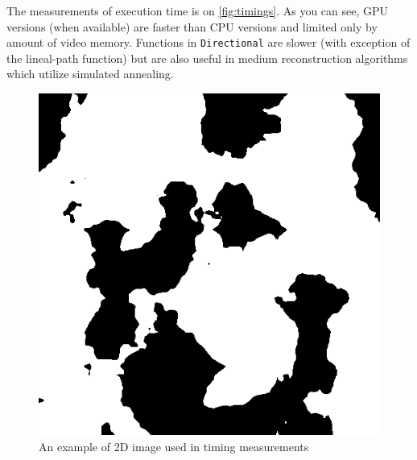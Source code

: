 \documentclass[reprint,amsmath,amssymb,aps,pre]{revtex4-1}
\newcommand{\code}[1]{\colorbox{light-gray}{\texttt{#1}}}
\begin{document}
The measurements of execution time is on \cref{fig:timings}. As you can see, GPU
versions (when available) are faster than CPU versions and limited only by
amount of video memory. Functions in \code{Directional} are slower (with
exception of the lineal-path function) but are also useful in medium
reconstruction algorithms which utilize simulated annealing.

\begin{figure}[ht]
  \centering
  \includegraphics[width=.3\textwidth]{images/timing-image.png}
  \caption[]{{\small An example of 2D image used in timing measurements}}
  \label{fig:valuenoise}
\end{figure}
\end{document}
